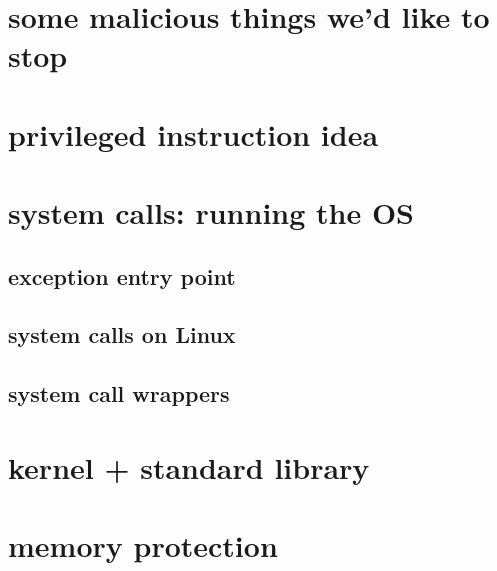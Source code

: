 \date{}
\title{}
\date{}

\begin{frame}
    \titlepage
\end{frame}



\section{some malicious things we'd like to stop}



\section{privileged instruction idea}


\section{system calls: running the OS}

\subsection{exception entry point}


\subsection{system calls on Linux}


\subsection{system call wrappers}


\section{kernel + standard library}



\section{memory protection}

